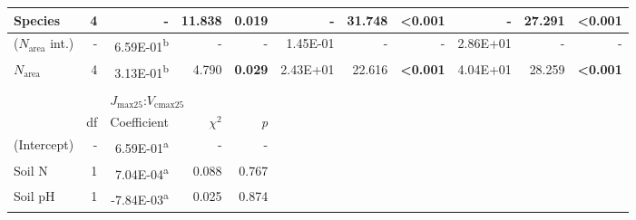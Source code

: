 \begin{landscape}
\begin{table}
{\begin{tabular}{p{2.5cm}p{0.5cm}p{2cm}p{1.5cm}p{1.5cm}p{2cm}p{1.5cm}p{1.5cm}p{2cm}p{1.5cm}p{1.5cm}}
            Species & \multicolumn{1}{r}{4}
            & \multicolumn{1}{r}{-} & \multicolumn{1}{r}{11.838} & \multicolumn{1}{r}{\textbf{0.019}}
            & \multicolumn{1}{r}{-} & \multicolumn{1}{r}{31.748} & \multicolumn{1}{r}{\textbf{\textless{}0.001}}
            & \multicolumn{1}{r}{-} & \multicolumn{1}{r}{27.291} & \multicolumn{1}{r}{\textbf{\textless{}0.001}}
            \\
            \hline

            ($N_\mathrm{area}$ int.) & \multicolumn{1}{r}{-}
            & \multicolumn{1}{r}{6.59E-01\textsuperscript{b}} & \multicolumn{1}{r}{-} & \multicolumn{1}{r}{-}
            & \multicolumn{1}{r}{1.45E-01}                    & \multicolumn{1}{r}{-} & \multicolumn{1}{r}{-}
            & \multicolumn{1}{r}{2.86E+01}                    & \multicolumn{1}{r}{-} & \multicolumn{1}{r}{-}
            \\

            $N_\mathrm{area}$ & \multicolumn{1}{r}{4}
            & \multicolumn{1}{r}{3.13E-01\textsuperscript{b}} & \multicolumn{1}{r}{4.790} & \multicolumn{1}{r}{\textbf{0.029}}
            & \multicolumn{1}{r}{2.43E+01}                    & \multicolumn{1}{r}{22.616} & \multicolumn{1}{r}{\textbf{\textless{}0.001}}
            & \multicolumn{1}{r}{4.04E+01}                    & \multicolumn{1}{r}{28.259} & \multicolumn{1}{r}{\textbf{\textless{}0.001}}
            \\
            \hline
            &&&&&&&&&&
            \\

            && \multicolumn{3}{l}{$J_{\mathrm{max25}}$:$V_\mathrm{cmax25}$} &&&&& \\
            \hline
            & \multicolumn{1}{r}{df}
            & \multicolumn{1}{r}{Coefficient} & \multicolumn{1}{r}{$\chi^{2}$} & \multicolumn{1}{r}{\textit{p}} 
            \\
            \hline

            (Intercept) & \multicolumn{1}{r}{-}
            & \multicolumn{1}{r}{6.59E-01\textsuperscript{a}} & \multicolumn{1}{r}{-} & \multicolumn{1}{r}{-}
            &&&&&&
            \\

            Soil N & \multicolumn{1}{r}{1}
            & \multicolumn{1}{r}{7.04E-04\textsuperscript{a}}  & \multicolumn{1}{r}{0.088} & \multicolumn{1}{r}{0.767}
            &&&&&& 
            \\

            Soil pH & \multicolumn{1}{r}{1}
            & \multicolumn{1}{r}{-7.84E-03\textsuperscript{a}} & \multicolumn{1}{r}{0.025} & \multicolumn{1}{r}{0.874}
            &&&&&& 
            \\


\end{tabular}}
\end{table}
\end{landscape}
